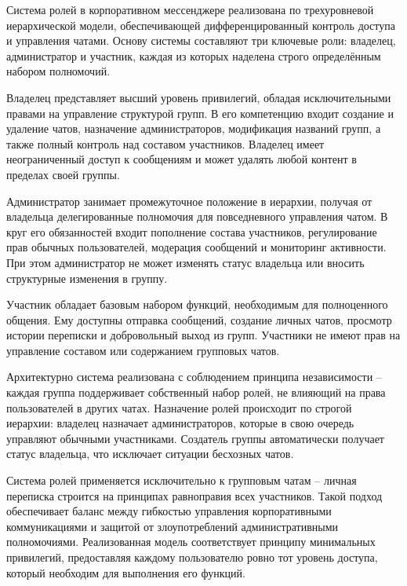 Система ролей в корпоративном мессенджере реализована по трехуровневой иерархической модели, обеспечивающей дифференцированный контроль доступа и управления чатами. Основу системы составляют три ключевые роли: владелец, администратор и участник, каждая из которых наделена строго определённым набором полномочий.

Владелец представляет высший уровень привилегий, обладая исключительными правами на управление структурой групп. В его компетенцию входит создание и удаление чатов, назначение администраторов, модификация названий групп, а также полный контроль над составом участников. Владелец имеет неограниченный доступ к сообщениям и может удалять любой контент в пределах своей группы.

Администратор занимает промежуточное положение в иерархии, получая от владельца делегированные полномочия для повседневного управления чатом. В круг его обязанностей входит пополнение состава участников, регулирование прав обычных пользователей, модерация сообщений и мониторинг активности. При этом администратор не может изменять статус владельца или вносить структурные изменения в группу.

Участник обладает базовым набором функций, необходимым для полноценного общения. Ему доступны отправка сообщений, создание личных чатов, просмотр истории переписки и добровольный выход из групп. Участники не имеют прав на управление составом или содержанием групповых чатов.

Архитектурно система реализована с соблюдением принципа независимости – каждая группа поддерживает собственный набор ролей, не влияющий на права пользователей в других чатах. Назначение ролей происходит по строгой иерархии: владелец назначает администраторов, которые в свою очередь управляют обычными участниками. Создатель группы автоматически получает статус владельца, что исключает ситуации бесхозных чатов.

Система ролей применяется исключительно к групповым чатам – личная переписка строится на принципах равноправия всех участников. Такой подход обеспечивает баланс между гибкостью управления корпоративными коммуникациями и защитой от злоупотреблений административными полномочиями. Реализованная модель соответствует принципу минимальных привилегий, предоставляя каждому пользователю ровно тот уровень доступа, который необходим для выполнения его функций.


